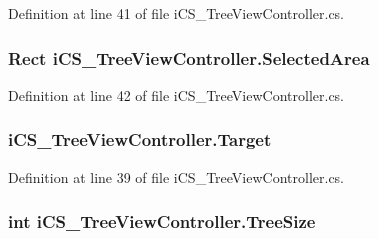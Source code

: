 Definition at line 41 of file i\+C\+S\+\_\+\+Tree\+View\+Controller.\+cs.

\hypertarget{classi_c_s___tree_view_controller_abb7f274a5a0ffa4a860f188bd90d0df2}{
\subsubsection[{Selected\+Area}]{\setlength{\rightskip}{0pt plus 5cm}Rect i\+C\+S\+\_\+\+Tree\+View\+Controller.\+Selected\+Area\hspace{0.3cm}{\ttfamily [get]}}}\label{classi_c_s___tree_view_controller_abb7f274a5a0ffa4a860f188bd90d0df2}


Definition at line 42 of file i\+C\+S\+\_\+\+Tree\+View\+Controller.\+cs.

\hypertarget{classi_c_s___tree_view_controller_a7ed1b0ca1f4fc0562e717f71d8fc4349}{
\subsubsection[{Target}]{ i\+C\+S\+\_\+\+Tree\+View\+Controller.\+Target\hspace{0.3cm}{\ttfamily [get]}}}\label{classi_c_s___tree_view_controller_a7ed1b0ca1f4fc0562e717f71d8fc4349}


Definition at line 39 of file i\+C\+S\+\_\+\+Tree\+View\+Controller.\+cs.

\hypertarget{classi_c_s___tree_view_controller_a23238e16ea1186344210a5fe3bec591d}{
\subsubsection[{Tree\+Size}]{\setlength{\rightskip}{0pt plus 5cm}int i\+C\+S\+\_\+\+Tree\+View\+Controller.\+Tree\+Size\hspace{0.3cm}{\ttfamily [get]}}}\label{classi_c_s___tree_view_controller_a23238e16ea1186344210a5fe3bec591d}


